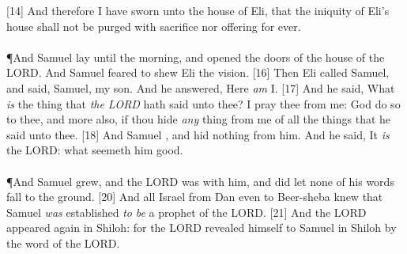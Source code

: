 [14] \textcolor[cmyk]{0.99998,1,0,0}{And therefore I have sworn unto the house of Eli, that the iniquity of Eli's house shall not be purged with sacrifice nor offering for ever.}\\
\\
\P \textcolor[cmyk]{0.99998,1,0,0}{And Samuel lay until the morning, and opened the doors of the house of the LORD. And Samuel feared to shew Eli the vision.}
[16] \textcolor[cmyk]{0.99998,1,0,0}{Then Eli called Samuel, and said, Samuel, my son. And he answered, Here \emph{am} I.}
[17] \textcolor[cmyk]{0.99998,1,0,0}{And he said, What \emph{is} the thing that \emph{the} \emph{LORD} hath said unto thee? I pray thee  from me: God do so to thee, and more also, if thou hide \emph{any} thing from me of all the things that he said unto thee.}
[18] \textcolor[cmyk]{0.99998,1,0,0}{And Samuel , and hid nothing from him. And he said, It \emph{is} the LORD:  what seemeth him good.}\\
\\
\P \textcolor[cmyk]{0.99998,1,0,0}{And Samuel grew, and the LORD was with him, and did let none of his words fall to the ground.}
[20] \textcolor[cmyk]{0.99998,1,0,0}{And all Israel from Dan even to Beer-sheba knew that Samuel \emph{was} established \emph{to} \emph{be} a prophet of the LORD.}
[21] \textcolor[cmyk]{0.99998,1,0,0}{And the LORD appeared again in Shiloh: for the LORD revealed himself to Samuel in Shiloh by the word of the LORD.}